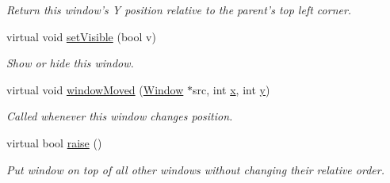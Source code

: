 \begin{DoxyCompactItemize}
\begin{DoxyCompactList}\small\item\em Return this window's Y position relative to the parent's top left corner. \end{DoxyCompactList}\item 
virtual void \hyperlink{classGUI_1_1TransientWindow_a5581ee490ae2ce490ca45e234f6712a2}{set\-Visible} (bool v)
\begin{DoxyCompactList}\small\item\em Show or hide this window. \end{DoxyCompactList}\item 
\hypertarget{classGUI_1_1TransientWindow_a7d6a4d5dbcc98148e501734d8abb85b0}{virtual void \hyperlink{classGUI_1_1TransientWindow_a7d6a4d5dbcc98148e501734d8abb85b0}{window\-Moved} (\hyperlink{classGUI_1_1Window}{Window} $\ast$src, int \hyperlink{classGUI_1_1Window_a6ca6a80ca00c9e1d8ceea8d3d99a657d}{x}, int \hyperlink{classGUI_1_1Window_a0ee8e923aff2c3661fc2e17656d37adf}{y})}\label{classGUI_1_1TransientWindow_a7d6a4d5dbcc98148e501734d8abb85b0}

\begin{DoxyCompactList}\small\item\em Called whenever this window changes position. \end{DoxyCompactList}\item 
\hypertarget{classGUI_1_1TransientWindow_a970674e955de6a1d5a0966953e56c587}{virtual bool \hyperlink{classGUI_1_1TransientWindow_a970674e955de6a1d5a0966953e56c587}{raise} ()}\label{classGUI_1_1TransientWindow_a970674e955de6a1d5a0966953e56c587}

\begin{DoxyCompactList}\small\item\em Put window on top of all other windows without changing their relative order. \end{DoxyCompactList}\end{DoxyCompactItemize}
